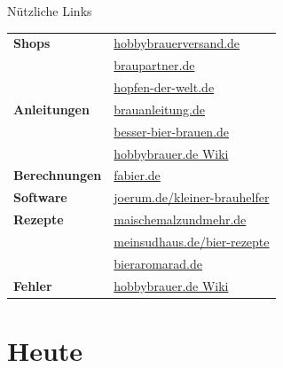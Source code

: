 \documentclass[9pt, ngerman]{beamer}
\begin{document}
\begin{frame}{Nützliche Links}
  \begin{table}
    \begin{tabular}{ll}
      \textbf{Shops}
        & \href{http://www.hobbybrauerversand.de}{hobbybrauerversand.de}\\
        & \href{http://www.braupartner.de}{braupartner.de}\\
        & \href{http://www.hopfen-der-welt.de}{hopfen-der-welt.de}\\
        \midrule
      \textbf{Anleitungen}
        & \href{http://brauanleitung.de}{brauanleitung.de}\\
        & \href{http://www.besser-bier-brauen.de}{besser-bier-brauen.de}\\
        & \href{http://hobbybrauer.de/forum/wiki}{hobbybrauer.de Wiki}\\
        \midrule
      \textbf{Berechnungen}
        & \href{http://fabier.de}{fabier.de}\\
        \midrule
      \textbf{Software}
        & \href{http://www.joerum.de/kleiner-brauhelfer}{joerum.de/kleiner-brauhelfer}\\
        \midrule
      \textbf{Rezepte}
        & \href{https://www.maischemalzundmehr.de}{maischemalzundmehr.de}\\
        & \href{http://meinsudhaus.de/bier-rezepte}{meinsudhaus.de/bier-rezepte}\\
        & \href{http://www.bieraromarad.de}{bieraromarad.de}\\
        \midrule
      \textbf{Fehler}
        & \href{http://hobbybrauer.de/forum/wiki/doku.php/bier:fehler}{hobbybrauer.de Wiki}
    \end{tabular}
  \end{table}
\end{frame}

\section{Heute}
\end{document}

